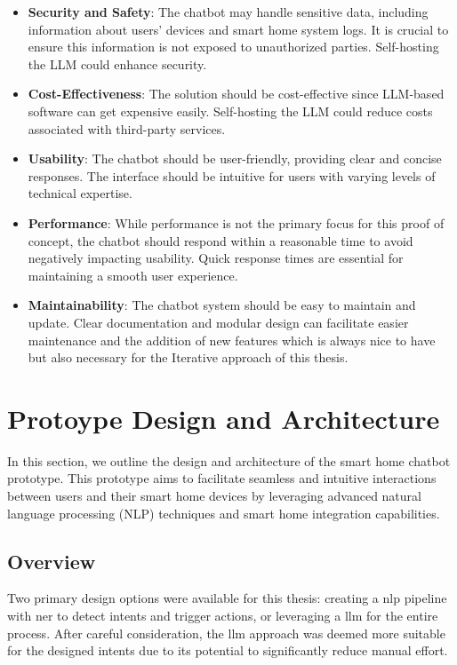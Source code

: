 \begin{itemize}
    \item \textbf{Security and Safety}: The chatbot may handle sensitive data, including information about users' devices and smart home system logs. It is crucial to ensure this information is not exposed to unauthorized parties. Self-hosting the LLM could enhance security.
    
    \item \textbf{Cost-Effectiveness}: The solution should be cost-effective since LLM-based software can get expensive easily. Self-hosting the LLM could reduce costs associated with third-party services.
    
    \item \textbf{Usability}: The chatbot should be user-friendly, providing clear and concise responses. The interface should be intuitive for users with varying levels of technical expertise. 
    
    \item \textbf{Performance}: While performance is not the primary focus for this proof of concept, the chatbot should respond within a reasonable time to avoid negatively impacting usability. Quick response times are essential for maintaining a smooth user experience.
        
    \item \textbf{Maintainability}: The chatbot system should be easy to maintain and update. Clear documentation and modular design can facilitate easier maintenance and the addition of new features which is always nice to have but also necessary for the Iterative approach of this thesis.
\end{itemize}

\section{Protoype Design and Architecture}
In this section, we outline the design and architecture of the smart home chatbot prototype. This prototype aims to facilitate seamless and intuitive interactions between users and their smart home devices by leveraging advanced natural language processing (NLP) techniques and smart home integration capabilities.

\subsection{Overview}
Two primary design options were available for this thesis: creating a \gls{nlp} pipeline with \gls{ner} to detect intents and trigger actions, or leveraging a \gls{llm} for the entire process. After careful consideration, the \gls{llm} approach was deemed more suitable for the designed intents due to its potential to significantly reduce manual effort.

